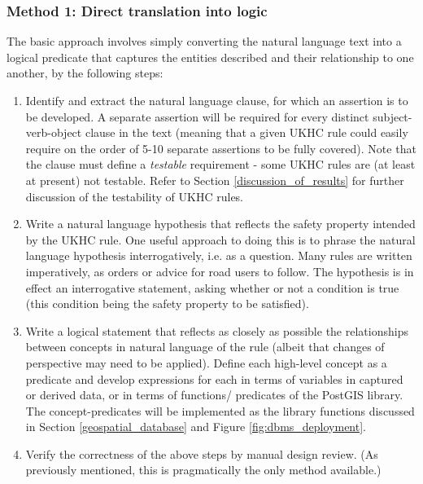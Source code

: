 \subsubsection{Method 1: Direct translation into logic} \label{direct_translation}

The basic approach involves simply converting the natural language text into a logical predicate that captures the entities described and their relationship to one another, by the following steps: 
\begin{enumerate}
    \item Identify and extract the natural language clause, for which an assertion is to be developed. A separate assertion will be required for every distinct subject-verb-object clause in the text (meaning that a given UKHC rule could easily require on the order of 5-10 separate assertions to be fully covered). Note that the clause must define a \emph{testable} requirement - some UKHC rules are (at least at present) not testable. Refer to Section \ref{discussion_of_results} for further discussion of the testability of UKHC rules.
    \item Write a natural language hypothesis that reflects the safety property intended by the UKHC rule. One useful approach to doing this is to phrase the natural language hypothesis interrogatively, i.e. as a question. Many rules are written imperatively, as orders or advice for road users to follow. The hypothesis is in effect an interrogative statement, asking whether or not a condition is true (this condition being the safety property to be satisfied). 
    \item Write a logical statement that reflects as closely as possible the relationships between concepts in natural language of the rule (albeit that changes of perspective may need to be applied). Define each high-level concept as a predicate and develop expressions for each in terms of variables in captured or derived data, or in terms of functions/ predicates of the PostGIS library. The concept-predicates will be implemented as the library functions discussed in Section \ref{geospatial_database} and Figure \ref{fig:dbms_deployment}.
    \item Verify the correctness of the above steps by manual design review. (As previously mentioned, this is pragmatically the only method available.)
\end{enumerate}

